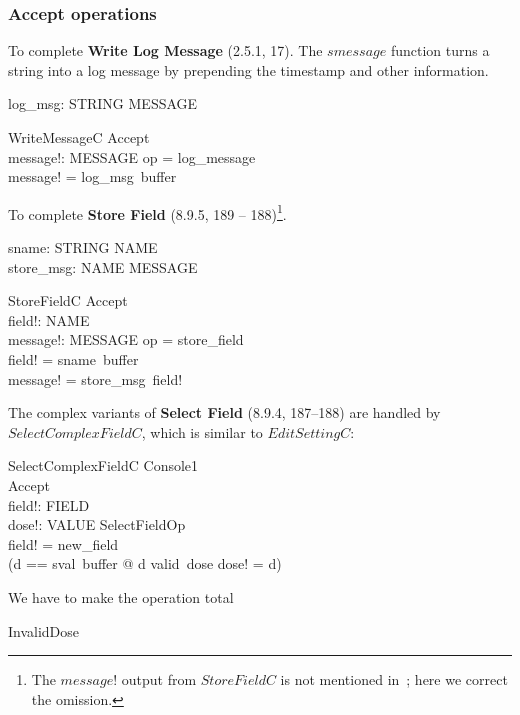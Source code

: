 \subsubsection{Accept operations}

To complete {\bf Write Log Message} (2.5.1, 17).  The $smessage$
function turns a string into a log message by prepending the timestamp
and other information.

\begin{axdef} log\_msg: STRING \fun MESSAGE \end{axdef}

\begin{schema}{WriteMessageC}
	Accept \\
	message!: MESSAGE
\where
	op = log\_message \\
	message! = log\_msg~buffer
\end{schema}

To complete {\bf Store Field} (8.9.5, 189 -- 188)\footnote{The
$message!$ output from $StoreFieldC$ is not mentioned
in~\cite{jacky92}; here we correct the omission.}.

\begin{axdef}
	sname: STRING \fun NAME \\
	store\_msg: NAME \fun MESSAGE
\end{axdef}
\begin{schema}{StoreFieldC}
	Accept \\
	field!: NAME \\
	message!: MESSAGE
\where
	op = store\_field \\
	field! = sname~buffer \\
	message! = store\_msg~field!
\end{schema}
The complex variants of {\bf Select Field} (8.9.4, 187--188) are
handled by $SelectComplexFieldC$, which is similar to $EditSettingC$:

\begin{schema}{SelectComplexFieldC}
	\Delta Console1 \\
	Accept \\
	field!: FIELD \\
	dose!: VALUE
\where
	SelectFieldOp \\
	field! = new\_field \\
	(\LET d == sval~buffer @ d \in valid~dose \land dose! = d)
\end{schema}
We have to make the operation total

\begin{zed}
InvalidDose 
\end{zed}

